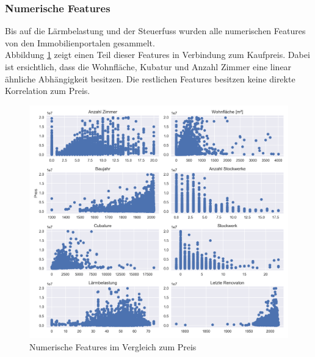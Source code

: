 \begin{table}[ht]
\centering
{}
\caption{Statistische Werte des Kaufpreises}
\label{tab:price}
\end{table}

\subsubsection{Numerische Features}
Bis auf die Lärmbelastung und der Steuerfuss wurden alle numerischen Features von den Immobilienportalen gesammelt.\\
Abbildung \ref{fig:num_features} zeigt einen Teil dieser Features in Verbindung zum Kaufpreis. Dabei ist ersichtlich, dass die Wohnfläche, Kubatur und Anzahl Zimmer eine linear ähnliche Abhängigkeit besitzen. Die restlichen Features besitzen keine direkte Korrelation zum Preis.

\begin{figure}[h]
\centering
\includegraphics[width=\textwidth]{images/Vergleich_zum_preis.png}
\caption[Numerische Features im Vergleich zum Preis]{Numerische Features im Vergleich zum Preis}%
\label{fig:num_features}
\end{figure}

